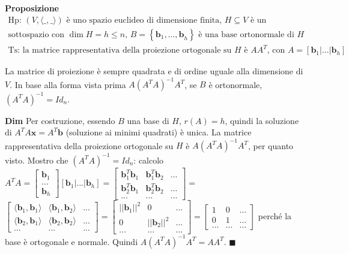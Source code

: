 \documentclass{article}
\begin{document}
\textbf{Proposizione}%
\begin{gather*}
\text{Hp}\text{: }\left( V,\langle \_,\_\rangle \right) \text{ \`{e} uno
spazio euclideo di dimensione finita, }H\subseteq V\text{ \`{e} un } \\
\text{sottospazio con }\dim H=h\leq n\text{, }B=\left\{ \mathbf{b}_{1}%
\mathbf{,...,b}_{h}\right\} \text{ \`{e} una base ortonormale di }H \\
\text{Ts}\text{:}\text{ la matrice rappresentativa della proiezione
ortogonale su }H\text{ \`{e} }AA^{T}\text{, con }A=\left[ \mathbf{b}_{1}|...|%
\mathbf{b}_{h}\right]
\end{gather*}

La matrice di proiezione \`{e} sempre quadrata e di ordine uguale alla
dimensione di $V$. In base alla forma vista prima $A\left( A^{T}A\right)
^{-1}A^{T}$, se $B$ \`{e} ortonormale, $\left( A^{T}A\right) ^{-1}=Id_{n}$.

\textbf{Dim} Per costruzione, essendo $B$ una base di $H$, $r\left( A\right)
=h$, quindi la soluzione di $A^{T}A\mathbf{x=}A^{T}\mathbf{b}$ (soluzione ai
minimi quadrati) \`{e} unica. La matrice rappresentativa della proiezione
ortogonale su $H$ \`{e} $A\left( A^{T}A\right) ^{-1}A^{T}$, per quanto
visto. Mostro che $\left( A^{T}A\right) ^{-1}=Id_{n}$: calcolo $A^{T}A=\left[
\begin{array}{c}
\mathbf{b}_{1} \\ 
... \\ 
\mathbf{b}_{h}%
\end{array}%
\right] \left[ \mathbf{b}_{1}|...|\mathbf{b}_{h}\right] =\left[ 
\begin{array}{ccc}
\mathbf{b}_{1}^{T}\mathbf{b}_{1} & \mathbf{b}_{1}^{T}\mathbf{b}_{2} & ... \\ 
\mathbf{b}_{2}^{T}\mathbf{b}_{1} & \mathbf{b}_{2}^{T}\mathbf{b}_{2} & ... \\ 
... & ... & ...%
\end{array}%
\right] =$ $\left[ 
\begin{array}{ccc}
\langle \mathbf{b}_{1},\mathbf{b}_{1}\rangle & \langle \mathbf{b}_{1},%
\mathbf{b}_{2}\rangle & ... \\ 
\langle \mathbf{b}_{2},\mathbf{b}_{1}\rangle & \langle \mathbf{b}_{2},%
\mathbf{b}_{2}\rangle & ... \\ 
... & ... & ...%
\end{array}%
\right] =\left[ 
\begin{array}{ccc}
\left\vert \left\vert \mathbf{b}_{1}\right\vert \right\vert ^{2} & 0 & ...
\\ 
0 & \left\vert \left\vert \mathbf{b}_{2}\right\vert \right\vert ^{2} & ...
\\ 
... & ... & ...%
\end{array}%
\right] =\left[ 
\begin{array}{ccc}
1 & 0 & ... \\ 
0 & 1 & ... \\ 
... & ... & ...%
\end{array}%
\right] $ perch\'{e} la base \`{e} ortogonale e normale. Quindi $A\left(
A^{T}A\right) ^{-1}A^{T}=AA^{T}$. $\blacksquare $
\end{document}
